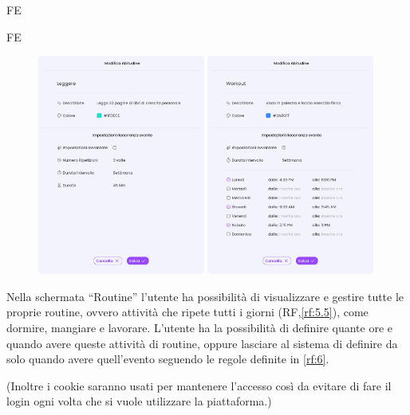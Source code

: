 \begin{listaPersonale}{FE}
\begin{listaPersonale2}{FE}
        \begin{center} 
            \begin{figure}[H]
            \centering\includegraphics[width=0.49\textwidth,height=0.35\textheight]{img/FrontEnd/Abitudini/Modifica/ModificaAbitudine.png}
            \centering\includegraphics[width=0.49\textwidth,height=0.35\textheight]{img/FrontEnd/Abitudini/Modifica/ModificaAbitudineAvv.png}
            \end{figure}
        \end{center}

    \end{listaPersonale2}
    \pagebreak

     Nella schermata “Routine” l’utente ha possibilità di visualizzare e gestire tutte le proprie routine, ovvero attività che ripete tutti i giorni (RF,\ref{rf:5.5}), come dormire, mangiare e lavorare. L’utente ha la possibilità di definire quante ore e quando avere queste attività di routine, oppure lasciare al sistema di definire da solo quando avere quell’evento seguendo le regole definite in \ref{rf:6}.
    

\end{listaPersonale}


(Inoltre i cookie saranno usati per mantenere l'accesso così da evitare di fare il login ogni volta che si vuole utilizzare la piattaforma.)